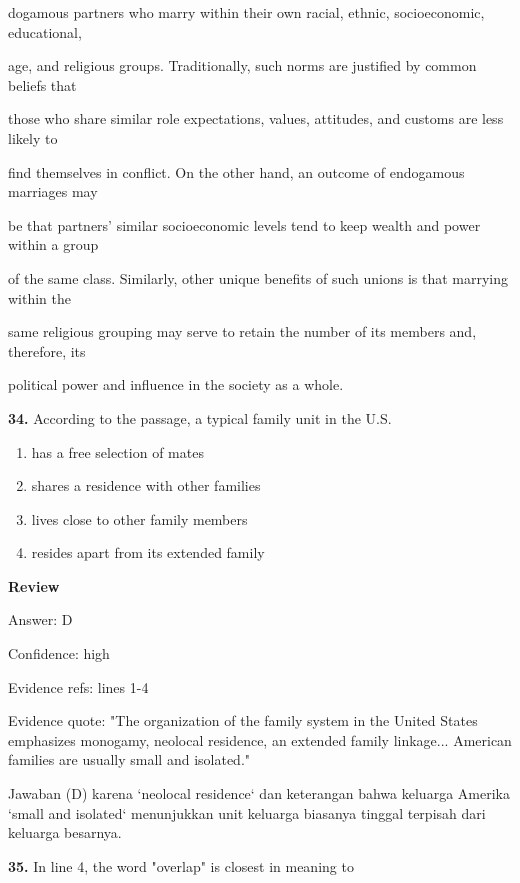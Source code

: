 \documentclass[12pt]{article}
\begin{document}
dogamous partners who marry within their own racial, ethnic, socioeconomic, educational,\par
age, and religious groups. Traditionally, such norms are justified by common beliefs that\par
those who share similar role expectations, values, attitudes, and customs are less likely to\par
find themselves in conflict. On the other hand, an outcome of endogamous marriages may\par
be that partners' similar socioeconomic levels tend to keep wealth and power within a group\par
of the same class. Similarly, other unique benefits of such unions is that marrying within the\par
same religious grouping may serve to retain the number of its members and, therefore, its\par
political power and influence in the society as a whole.\par
\endgroup
\medskip
\noindent\textbf{34.} According to the passage, a typical family unit in the U.S.
\begin{enumerate}[label=(\Alph*),leftmargin=*,itemsep=0.2em]
\item has a free selection of mates
\item shares a residence with other families
\item lives close to other family members
\item resides apart from its extended family
\end{enumerate}
\par
\begingroup
\setlength{\parskip}{0pt}
\setlength{\parindent}{0pt}
\textbf{Review}\par
Answer: D\par
Confidence: high\par
Evidence refs: lines 1-4\par
Evidence quote: "The organization of the family system in the United States emphasizes monogamy, neolocal residence, an extended family linkage... American families are usually small and isolated."\par
Jawaban (D) karena `neolocal residence` dan keterangan bahwa keluarga Amerika `small and isolated` menunjukkan unit keluarga biasanya tinggal terpisah dari keluarga besarnya.\par
\endgroup
\par
\vspace{0.25\baselineskip}
\noindent\textbf{35.} In line 4, the word "overlap" is closest in meaning to
\end{document}
